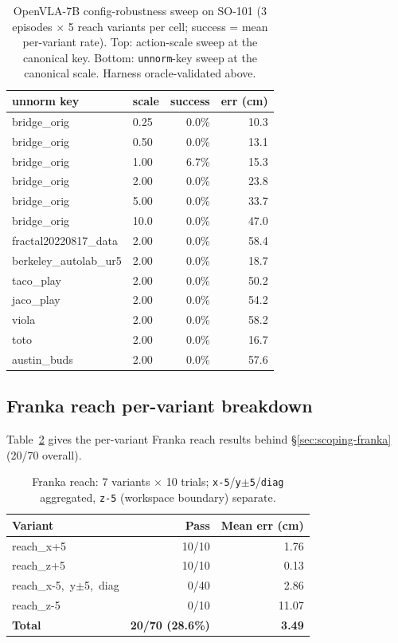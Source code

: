 \begin{table}[H]
\centering
\small
\setlength{\tabcolsep}{4pt}
\begin{tabular}{llrr}
\toprule
\textbf{unnorm key} & \textbf{scale} & \textbf{success} & \textbf{err (cm)} \\
\midrule
bridge\_orig & 0.25 & 0.0\% & 10.3 \\
bridge\_orig & 0.50 & 0.0\% & 13.1 \\
bridge\_orig & 1.00 & 6.7\% & 15.3 \\
bridge\_orig & 2.00 & 0.0\% & 23.8 \\
bridge\_orig & 5.00 & 0.0\% & 33.7 \\
bridge\_orig & 10.0 & 0.0\% & 47.0 \\
\midrule
fractal20220817\_data & 2.00 & 0.0\% & 58.4 \\
berkeley\_autolab\_ur5 & 2.00 & 0.0\% & 18.7 \\
taco\_play & 2.00 & 0.0\% & 50.2 \\
jaco\_play & 2.00 & 0.0\% & 54.2 \\
viola & 2.00 & 0.0\% & 58.2 \\
toto & 2.00 & 0.0\% & 16.7 \\
austin\_buds & 2.00 & 0.0\% & 57.6 \\
\bottomrule
\end{tabular}
\caption{OpenVLA-7B config-robustness sweep on SO-101 (3 episodes
$\times$ 5 reach variants per cell; success = mean per-variant rate).
Top: action-scale sweep at the canonical key. Bottom: \texttt{unnorm}-key
sweep at the canonical scale. Harness oracle-validated above.}
\label{tab:openvla-sweep}
\end{table}

\subsection{Franka reach per-variant breakdown}
\label{app:franka}

Table~\ref{tab:franka} gives the per-variant Franka reach results
behind \S\ref{sec:scoping-franka} (20/70 overall).

\begin{table}[H]
\centering
\footnotesize
\setlength{\tabcolsep}{4pt}
\renewcommand{\arraystretch}{0.9}
\begin{tabular}{lrr}
\toprule
\textbf{Variant}  & \textbf{Pass} & \textbf{Mean err (cm)} \\
\midrule
reach\_x+5  & 10/10 & 1.76 \\
reach\_z+5  & 10/10 & 0.13 \\
reach\_x-5,~y$\pm$5,~diag &  0/40 & 2.86 \\
reach\_z-5  &  0/10 & 11.07 \\
\textbf{Total} & \textbf{20/70 (28.6\%)} & \textbf{3.49} \\
\bottomrule
\end{tabular}
\caption{Franka reach: 7 variants $\times$ 10 trials;
\texttt{x-5}/\texttt{y$\pm$5}/\texttt{diag} aggregated,
\texttt{z-5} (workspace boundary) separate.}
\label{tab:franka}
\end{table}

